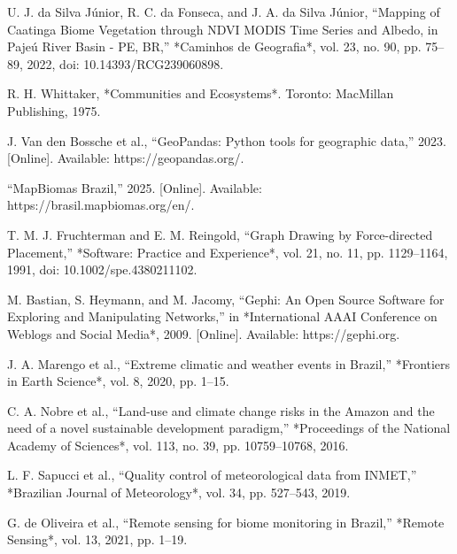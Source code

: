 \documentclass[conference]{IEEEtran}
\begin{document}
\begin{thebibliography}{00}
  U. J. da Silva Júnior, R. C. da Fonseca, and J. A. da Silva Júnior, “Mapping of Caatinga Biome Vegetation through NDVI MODIS Time Series and Albedo, in Pajeú River Basin - PE, BR,” *Caminhos de Geografia*, vol. 23, no. 90, pp. 75–89, 2022, doi: 10.14393/RCG239060898.
  
  R. H. Whittaker, *Communities and Ecosystems*. Toronto: MacMillan Publishing, 1975.
  
  J. Van den Bossche et al., “GeoPandas: Python tools for geographic data,” 2023. [Online]. Available: https://geopandas.org/.
  
  “MapBiomas Brazil,” 2025. [Online]. Available: https://brasil.mapbiomas.org/en/.
  
  T. M. J. Fruchterman and E. M. Reingold, “Graph Drawing by Force-directed Placement,” *Software: Practice and Experience*, vol. 21, no. 11, pp. 1129--1164, 1991, doi: 10.1002/spe.4380211102.
  
  M. Bastian, S. Heymann, and M. Jacomy, “Gephi: An Open Source Software for Exploring and Manipulating Networks,” in *International AAAI Conference on Weblogs and Social Media*, 2009. [Online]. Available: https://gephi.org.
  
  J. A. Marengo et al., “Extreme climatic and weather events in Brazil,” *Frontiers in Earth Science*, vol. 8, 2020, pp. 1--15.
  
  C. A. Nobre et al., “Land-use and climate change risks in the Amazon and the need of a novel sustainable development paradigm,” *Proceedings of the National Academy of Sciences*, vol. 113, no. 39, pp. 10759--10768, 2016.
  
  L. F. Sapucci et al., “Quality control of meteorological data from INMET,” *Brazilian Journal of Meteorology*, vol. 34, pp. 527--543, 2019.
  
  G. de Oliveira et al., “Remote sensing for biome monitoring in Brazil,” *Remote Sensing*, vol. 13, 2021, pp. 1--19.
  
  \end{thebibliography}
  
\end{document}

